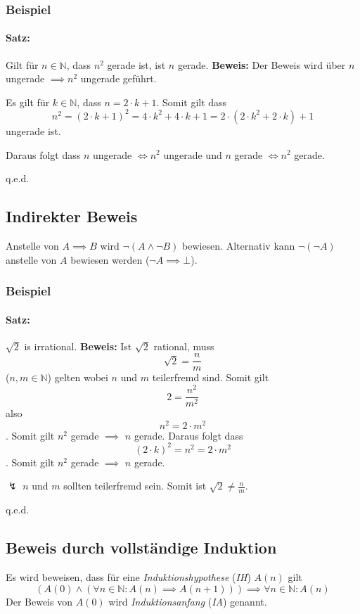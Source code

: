 \documentclass[12pt]{scrreprt}
\newcommand{\theorem}[1]{\paragraph{Satz:} #1\newline}
\newenvironment{proof}
    {\textbf{Beweis:}\newline\indent}
    {\begin{flushright}q.e.d.\end{flushright}}
\begin{document}
                \subsubsection{Beispiel}
                    \theorem{Gilt für $ n \in \mathbb{N} $, dass $ n ^ 2 $ gerade ist, ist $ n $ gerade.}
                        \begin{proof}
                            Der Beweis wird über $ n $ ungerade $ \implies n ^ 2 $ ungerade geführt.

                            Es gilt für $ k \in \mathbb{N} $, dass $ n = 2 \cdot k + 1 $. Somit gilt dass \[ n ^ 2 = (2 \cdot k + 1) ^ 2 = 4 \cdot k ^ 2 + 4 \cdot k + 1 = 2 \cdot (2 \cdot k ^ 2 + 2 \cdot k) + 1 \] ungerade ist.

                            Daraus folgt dass $ n $ ungerade $ \iff n ^ 2 $ ungerade und $ n $ gerade $ \iff n ^ 2 $ gerade.
                        \end{proof}


            \subsection{Indirekter Beweis}
                Anstelle von $ A \implies B $ wird $ \lnot (A \land \lnot B) $ bewiesen. Alternativ kann $ \lnot (\lnot A) $ anstelle von $ A $ bewiesen werden ($ \lnot A \implies \bot $).

                \subsubsection{Beispiel}
                    \theorem{$ \sqrt{2} $ is irrational.}
                        \begin{proof}
                            Ist $ \sqrt{2} $ rational, muss \[ \sqrt{2} = \frac{n}{m} \] ($ n, m \in \mathbb{N} $) gelten wobei $ n $ und $ m $ teilerfremd sind. Somit gilt \[ 2 = \frac{n ^ 2}{m ^ 2} \] also \[ n ^ 2 = 2 \cdot m ^ 2 \]. Somit gilt $ n ^ 2 $ gerade $ \implies $ $ n $ gerade. Daraus folgt dass \[ (2 \cdot k) ^ 2 = n ^ 2 = 2 \cdot m ^ 2 \]. Somit gilt $ n ^ 2 $ gerade $ \implies $ $ n $ gerade.

                            $ \lightning $ $ n $ und $ m $ sollten teilerfremd sein. Somit ist $ \sqrt{2} \neq \frac{n}{m} $.
                        \end{proof}


            \subsection{Beweis durch vollständige Induktion}
                Es wird beweisen, dass für eine \textit{Induktionshypothese} (\textit{IH}) $ A(n) $ gilt \[ (A(0) \land (\forall n \in \mathbb{N} : A(n) \implies A(n + 1))) \implies \forall n \in \mathbb{N} : A(n) \]
                Der Beweis von $ A(0) $ wird \textit{Induktionsanfang} (\textit{IA}) genannt.
\end{document}
